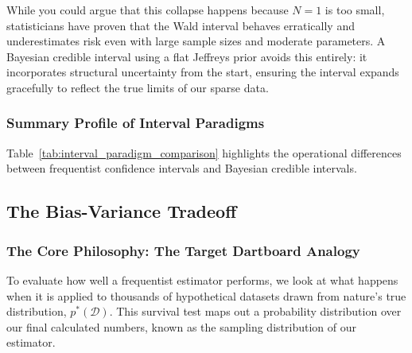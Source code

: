 \documentclass{article}
\begin{document}
While you could argue that this collapse happens because $N=1$ is too small, statisticians have proven that the Wald interval behaves erratically and underestimates risk even with large sample sizes and moderate parameters. A Bayesian credible interval using a flat Jeffreys prior avoids this entirely: it incorporates structural uncertainty from the start, ensuring the interval expands gracefully to reflect the true limits of our sparse data.

\subsubsection{Summary Profile of Interval Paradigms}
Table~\ref{tab:interval_paradigm_comparison} highlights the operational differences between frequentist confidence intervals and Bayesian credible intervals.

\begin{table}[htbp]
\centering
\small
\renewcommand{\arraystretch}{1.4}
\caption{Operational and Philosophical Breakdown of Interval Frameworks}
\label{tab:interval_paradigm_comparison}
\end{table}

\subsection{The Bias-Variance Tradeoff}

\subsubsection{The Core Philosophy: The Target Dartboard Analogy}
To evaluate how well a frequentist estimator performs, we look at what happens when it is applied to thousands of hypothetical datasets drawn from nature's true distribution, $p^*(\mathcal{D})$. This survival test maps out a probability distribution over our final calculated numbers, known as the sampling distribution of our estimator.
\end{document}
